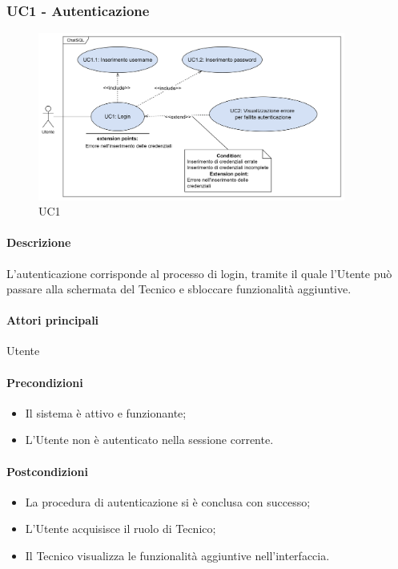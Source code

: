 \subsubsection{UC1 - Autenticazione}\label{UC1}

\begin{figure}[H]
  \centering
  \includegraphics[width=0.90\textwidth]{assets/uc1.png}
  \caption{UC1}
\end{figure}

\paragraph*{Descrizione}
L'autenticazione corrisponde al processo di login, tramite il quale l'Utente può passare alla schermata del Tecnico e sbloccare funzionalità aggiuntive.

\paragraph*{Attori principali}
Utente

\paragraph*{Precondizioni}
\begin{itemize}
  \item Il sistema è attivo e funzionante;
  \item L'Utente non è autenticato nella sessione corrente.
\end{itemize}

\paragraph*{Postcondizioni}
\begin{itemize}
  \item La procedura di autenticazione si è conclusa con successo;
  \item L'Utente acquisisce il ruolo di Tecnico;
  \item Il Tecnico visualizza le funzionalità aggiuntive nell'interfaccia.  
\end{itemize}

